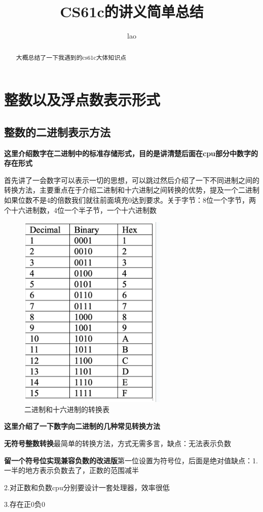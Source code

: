 \documentclass{ctexart}
\begin{document}
\title{CS61c的讲义简单总结}
\author{lao}
\maketitle
\tableofcontents

\begin{abstract}
大概总结了一下我遇到的cs61c大体知识点
\end{abstract}

\section{整数以及浮点数表示形式}
\subsection{整数的二进制表示方法}
\textbf{这里介绍数字在二进制中的标准存储形式，目的是讲清楚后面在cpu部分中数字的存在形式}\par
首先讲了一会数字可以表示一切的思想，可以跳过然后介绍了一下不同进制之间的转换方法，主要重点在于介绍二进制和十六进制之间转换的优势，提及一个二进制如果位数不是4的倍数我们就往前面填充0达到要求。关于字节：8位一个字节，两个十六进制数，4位一个半子节，一个十六进制数
\begin{figure}
    \centering
    \includegraphics[width=0.5\linewidth]{binary_Hex_convert.png}
    \caption{二进制和十六进制的转换表}
    \label{fig:enter-label}
\end{figure}
\textbf{这里介绍了一下数字向二进制的几种常见转换方法}\par
\textbf{无符号整数转换}最简单的转换方法，方式无需多言，缺点：无法表示负数\par
\textbf{留一个符号位实现兼容负数的改进版}第一位设置为符号位，后面是绝对值缺点：1.一半的地方表示负数去了，正数的范围减半\par2.对正数和负数cpu分别要设计一套处理器，效率很低\par3.存在正0负0\par
\end{document}
